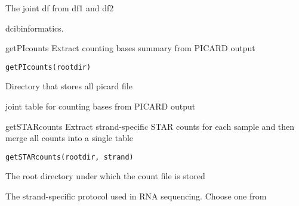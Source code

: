 \documentclass[letterpaper]{book}
\begin{document}
%
\begin{Value}
The joint df from df1 and df2
\end{Value}
%
\begin{Description}\relax
dcibinformatics.
\end{Description}
%
\begin{Description}\relax
getPIcounts
Extract counting bases summary from PICARD output
\end{Description}
%
\begin{Usage}
\begin{verbatim}
getPIcounts(rootdir)
\end{verbatim}
\end{Usage}
%
\begin{Arguments}
\begin{ldescription}
\item[\code{rootdir}] Directory that stores all picard  file
\end{ldescription}
\end{Arguments}
%
\begin{Value}
joint table for counting bases from PICARD output
\end{Value}
%
\begin{Description}\relax
getSTARcounts
Extract strand-specific STAR counts for each sample and then merge all counts into a single table
\end{Description}
%
\begin{Usage}
\begin{verbatim}
getSTARcounts(rootdir, strand)
\end{verbatim}
\end{Usage}
%
\begin{Arguments}
\begin{ldescription}
\item[\code{rootdir}] The root directory under which the count file is stored

\item[\code{strand}] The strand-specific protocol used in RNA sequencing. Choose one from 
\end{ldescription}
\end{Arguments}
\end{document}
